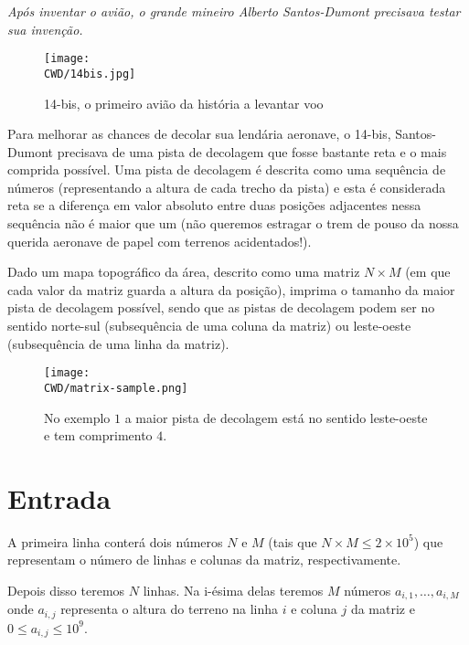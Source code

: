 %

\begin{center}
\textit{Após inventar o avião, o grande mineiro Alberto Santos-Dumont precisava testar sua invenção.}
\end{center}

\begin{figure}[H]
  \centering
  \texttt{[image: \\CWD/14bis.jpg]}
  \caption{14-bis, o primeiro avião da história a levantar voo}
\end{figure}

Para melhorar as chances de decolar sua lendária aeronave, o 14-bis, Santos-Dumont precisava de uma pista de decolagem que fosse bastante reta e o mais comprida possível. Uma pista de decolagem é descrita como uma sequência de números (representando a altura de cada trecho da pista) e esta é considerada reta se a diferença em valor absoluto entre duas posições adjacentes nessa sequência não é maior que um (não queremos estragar o trem de pouso da nossa querida aeronave de papel com terrenos acidentados!).

Dado um mapa topográfico da área, descrito como uma matriz $N\times M$ (em que cada valor da matriz guarda a altura da posição), imprima o tamanho da maior pista de decolagem possível, sendo que as pistas de decolagem podem ser no sentido norte-sul (subsequência de uma coluna da matriz) ou leste-oeste (subsequência de uma linha da matriz).

\begin{figure}[H]
  \centering
  \texttt{[image: \\CWD/matrix-sample.png]}
  \caption{No exemplo $1$ a maior pista de decolagem está no sentido leste-oeste e tem comprimento $4$.}
\end{figure}
%
%
\section*{Entrada}

A primeira linha conterá dois números $N$ e $M$ (tais que $N \times M \leq 2\times 10^5$) que representam o número de linhas e colunas da matriz, respectivamente.

Depois disso teremos $N$ linhas. Na i-ésima delas teremos $M$ números $a_{i, 1}, \ldots, a_{i, M}$ onde $a_{i, j}$ representa o altura do terreno na linha $i$ e coluna $j$ da matriz e $0 \leq a_{i, j} \leq 10^9$.

